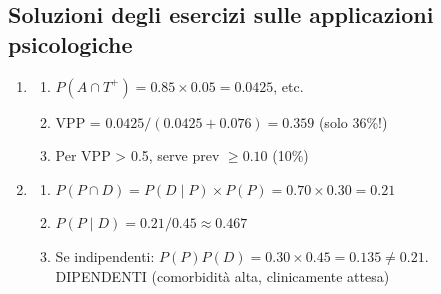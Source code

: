\documentclass[
  italian,
  letterpaper,
  a4paper,
  11pt,
  open=any]{scrbook}
\providecommand{\tightlist}{%
  \setlength{\itemsep}{0pt}\setlength{\parskip}{0pt}}
\theoremstyle{plain}
\theoremstyle{definition}
\theoremstyle{definition}
\theoremstyle{remark}
\begin{document}
\begin{tcolorbox}
\subsection*{Soluzioni degli esercizi sulle applicazioni
psicologiche}\label{soluzioni-degli-esercizi-sulle-applicazioni-psicologiche}

\begin{enumerate}
\def\labelenumi{\arabic{enumi}.}
\setcounter{enumi}{19}
\tightlist
\item
  \begin{enumerate}
  \def\labelenumii{\alph{enumii}.}
  \tightlist
  \item
    \(P(A \cap T^+) = 0.85 \times 0.05 = 0.0425\), etc.
  \item
    VPP = \(0.0425 / (0.0425 + 0.076) = 0.359\) (solo 36\%!)
  \item
    Per VPP \textgreater{} 0.5, serve prev \(\geq 0.10\) (10\%)
  \end{enumerate}
\item
  \begin{enumerate}
  \def\labelenumii{\alph{enumii}.}
  \tightlist
  \item
    \(P(P \cap D) = P(D \mid P) \times P(P) = 0.70 \times 0.30 = 0.21\)
  \item
    \(P(P \mid D) = 0.21 / 0.45 \approx 0.467\)
  \item
    Se indipendenti: \(P(P) P(D) = 0.30 \times 0.45 = 0.135 \neq 0.21\).
    DIPENDENTI (comorbidità alta, clinicamente attesa)
  \end{enumerate}
\end{enumerate}

\end{tcolorbox}
\end{document}
